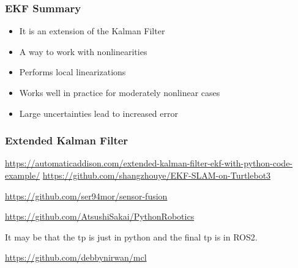    \begin{frame}
    \frametitle{EKF Summary}
    
    \begin{itemize}
    \item It is an extension of the Kalman Filter
    \item A way to work with nonlinearities
    \item Performs local linearizations
    \item Works well in practice for moderately nonlinear cases
    \item Large uncertainties lead to increased error
    \end{itemize}
    
    \end{frame}
    
    \begin{frame}
    \frametitle{Extended Kalman Filter}
    
    
    \footnotesize 
    \url{https://automaticaddison.com/extended-kalman-filter-ekf-with-python-code-example/}
     \url{https://github.com/shangzhouye/EKF-SLAM-on-Turtlebot3}
    
     \url{https://github.com/ser94mor/sensor-fusion}
    
     \url{https://github.com/AtsushiSakai/PythonRobotics}
    
     It may be that the tp is just in python and the final tp is in ROS2.
    
     \url{https://github.com/debbynirwan/mcl}
    
    
\end{frame}
